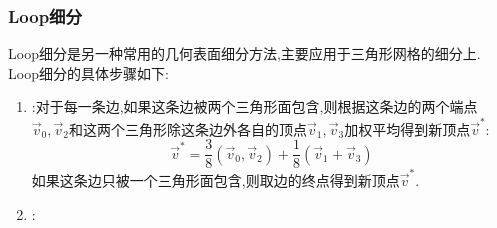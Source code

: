 \documentclass{ctexart}
\begin{document}
\subsubsection{Loop细分}
Loop细分是另一种常用的几何表面细分方法,主要应用于三角形网格的细分上. Loop细分的具体步骤如下:
\begin{enumerate}[label=\tbf{\arabic*}.,topsep=0pt,parsep=0pt,itemsep=0pt,partopsep=0pt]
    \item {}:对于每一条边,如果这条边被两个三角形面包含,则根据这条边的两个端点$\vec{v}_0,\vec{v}_2$和这两个三角形除这条边外各自的顶点$\vec{v}_1,\vec{v}_3$加权平均得到新顶点$\vec{v}^\ast$:
        \[\vec{v}^\ast=\dfrac{3}{8}\left(\vec{v}_0,\vec{v}_2\right)+\dfrac{1}{8}\left(\vec{v}_1+\vec{v}_3\right)\]
    如果这条边只被一个三角形面包含,则取边的终点得到新顶点$\vec{v}^\ast$.
    \item {}:
\end{enumerate}
\end{document}
